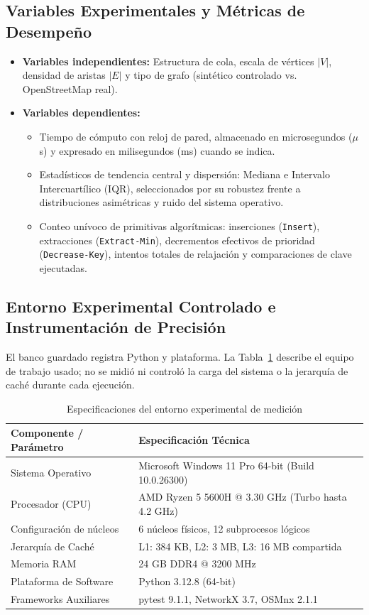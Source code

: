 \subsection{Variables Experimentales y Métricas de Desempeño}
\begin{itemize}
    \item \textbf{Variables independientes:} Estructura de cola, escala de vértices $|V|$, densidad de aristas $|E|$ y tipo de grafo (sintético controlado vs. OpenStreetMap real).
    \item \textbf{Variables dependientes:}
    \begin{itemize}
        \item Tiempo de cómputo con reloj de pared, almacenado en microsegundos ($\mu$s) y expresado en milisegundos (ms) cuando se indica.
        \item Estadísticos de tendencia central y dispersión: Mediana e Intervalo Intercuartílico (IQR), seleccionados por su robustez frente a distribuciones asimétricas y ruido del sistema operativo.
        \item Conteo unívoco de primitivas algorítmicas: inserciones (\texttt{Insert}), extracciones (\texttt{Extract-Min}), decrementos efectivos de prioridad (\texttt{Decrease-Key}), intentos totales de relajación y comparaciones de clave ejecutadas.
    \end{itemize}
\end{itemize}

\subsection{Entorno Experimental Controlado e Instrumentación de Precisión}
El banco guardado registra Python y plataforma. La Tabla~\ref{tab:entorno} describe el equipo de trabajo usado; no se midió ni controló la carga del sistema o la jerarquía de caché durante cada ejecución.

\begin{table}[H]
    \centering
    \fontsize{9.5}{11.5}\selectfont
    \caption{Especificaciones del entorno experimental de medición}
    \label{tab:entorno}
    \begin{tabular}{@{}ll@{}}
        \toprule
        \textbf{Componente / Parámetro} & \textbf{Especificación Técnica} \\
        \midrule
        Sistema Operativo & Microsoft Windows 11 Pro 64-bit (Build 10.0.26300) \\
        Procesador (CPU) & AMD Ryzen 5 5600H @ 3.30 GHz (Turbo hasta 4.2 GHz) \\
        Configuración de núcleos & 6 núcleos físicos, 12 subprocesos lógicos \\
        Jerarquía de Caché & L1: 384 KB, L2: 3 MB, L3: 16 MB compartida \\
        Memoria RAM & 24 GB DDR4 @ 3200 MHz \\
        Plataforma de Software & Python 3.12.8 (64-bit) \\
        Frameworks Auxiliares & pytest 9.1.1, NetworkX 3.7, OSMnx 2.1.1 \\
        \bottomrule
    \end{tabular}
\end{table}


